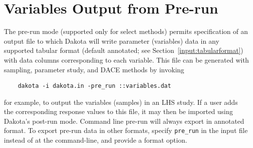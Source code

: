 \section{Variables Output from Pre-run}

The pre-run mode (supported only for select methods) permits
specification of an output file to which Dakota will write parameter
(variables) data in any supported tabular format (default annotated; see
Section~\ref{input:tabularformat}) with data columns corresponding to
each variable.  This file can be generated with sampling, parameter
study, and DACE methods by invoking
\begin{small}
\begin{verbatim}
    dakota -i dakota.in -pre_run ::variables.dat
\end{verbatim}
\end{small}
for example, to output the variables (samples) in an LHS study.  If a
user adds the corresponding response values to this file, it may then
be imported using Dakota's post-run mode.  Command line pre-run will
always export in annotated format.  To export pre-run data in other
formats, specify \texttt{pre\_run} in the input file instead of at the
command-line, and provide a format option.

